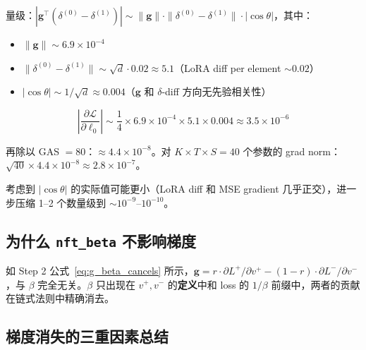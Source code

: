 \documentclass[11pt,a4paper]{article}
\newcommand{\loss}{\mathcal{L}}
\theoremstyle{definition}
\begin{document}
量级：$|\mathbf{g}^\top(\delta^{(0)} - \delta^{(1)})| \sim \|\mathbf{g}\| \cdot \|\delta^{(0)} - \delta^{(1)}\| \cdot |\cos\theta|$，其中：
\begin{itemize}[leftmargin=1.5em]
\item $\|\mathbf{g}\| \sim 6.9 \times 10^{-4}$
\item $\|\delta^{(0)} - \delta^{(1)}\| \sim \sqrt{d} \cdot 0.02 \approx 5.1$（LoRA diff per element $\sim 0.02$）
\item $|\cos\theta| \sim 1/\sqrt{d} \approx 0.004$（$\mathbf{g}$ 和 $\delta$-diff 方向无先验相关性）
\end{itemize}

\begin{equation}
\left|\frac{\partial \loss}{\partial \ell_0}\right| \sim \frac{1}{4} \times 6.9 \times 10^{-4} \times 5.1 \times 0.004 \approx 3.5 \times 10^{-6}
\end{equation}

再除以 GAS $= 80$：$\approx 4.4 \times 10^{-8}$。对 $K \times T \times S = 40$ 个参数的 grad norm：$\sqrt{40} \times 4.4 \times 10^{-8} \approx 2.8 \times 10^{-7}$。

考虑到 $|\cos\theta|$ 的实际值可能更小（LoRA diff 和 MSE gradient 几乎正交），进一步压缩 1--2 个数量级到 $\sim 10^{-9}$--$10^{-10}$。

\subsection{为什么 \texttt{nft\_beta} 不影响梯度}

如 Step 2 公式~\eqref{eq:g_beta_cancels} 所示，$\mathbf{g} = r \cdot \partial L^+/\partial v^+ - (1-r) \cdot \partial L^-/\partial v^-$，与 $\beta$ 完全无关。$\beta$ 只出现在 $v^+, v^-$ 的\textbf{定义}中和 loss 的 $1/\beta$ 前缀中，两者的贡献在链式法则中精确消去。

\subsection{梯度消失的三重因素总结}
\end{document}
